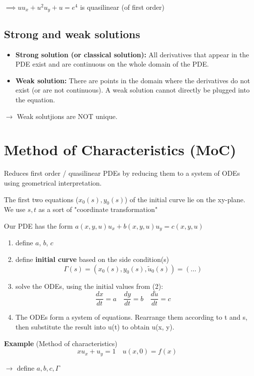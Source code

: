 $\implies uu_x + u^2u_y + u = e^4$ is quasilinear (of first order)

\subsection{Strong and weak solutions}
\begin{itemize}
    \item \textbf{Strong solution (or classical solution):} All derivatives that appear in the PDE exist and are continuous on the whole domain of the PDE.
    \item \textbf{Weak solution:} There are points in the domain where the derivatives do not exist (or are not continuous). A weak solution cannot directly be plugged into the equation.
\end{itemize}

$\to$ Weak solutjions are NOT unique.

\section{Method of Characteristics (MoC)}
Reduces first order / quasilinear PDEs by reducing them to a system of ODEs using geometrical interpretation.

The first two equations ($x_0(s),y_0(s)$) of the initial curve lie on the xy-plane. We use $s,t$ as a sort of "coordinate transformation"
\begin{recipe}
Our PDE has the form $a(x,y,u)u_x + b(x,y,u)u_y = c(x,y,u)$
\begin{enumerate}
 \item define $a$, $b$, $c$
 \item define \textbf{initial curve} based on the side condition(s)
 $$\varGamma(s) = (x_0(s), y_0(s), \tilde{u}_0(s)) = (\dots)$$
 \item solve the ODEs, using the initial values from (2):
 $$\frac{dx}{dt}=a \quad \frac{dy}{dt}=b \quad \frac{d\tilde{u}}{dt}=c$$
 \item The ODEs form a system of equations. Rearrange them according to t and s, then substitute the result into u(t) to obtain u(x, y).
\end{enumerate}
\end{recipe}


\textbf{Example} (Method of characteristics)
$$xu_x+u_y = 1 \quad u(x,0)=f(x)$$

$\to$ define $a,b,c,\varGamma$

